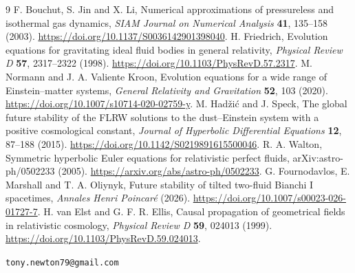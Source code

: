 \documentclass[11pt,a4paper]{article}
\begin{document}
\begin{thebibliography}{9}
F. Bouchut, S. Jin and X. Li,
Numerical approximations of
pressureless and isothermal gas dynamics,
\emph{SIAM Journal on Numerical Analysis}
\textbf{41}, 135--158 (2003).
\url{https://doi.org/10.1137/S0036142901398040}.
H. Friedrich,
Evolution equations for gravitating
ideal fluid bodies in general relativity,
\emph{Physical Review D} \textbf{57},
2317--2322 (1998).
\url{https://doi.org/10.1103/PhysRevD.57.2317}.
M. Normann and J. A. Valiente Kroon,
Evolution equations for a wide range
of Einstein--matter systems,
\emph{General Relativity and Gravitation}
\textbf{52}, 103 (2020).
\url{https://doi.org/10.1007/s10714-020-02759-y}.
M. Had\v{z}i\'c and J. Speck,
The global future stability of the
FLRW solutions to the dust--Einstein
system with a positive cosmological constant,
\emph{Journal of Hyperbolic Differential Equations}
\textbf{12}, 87--188 (2015).
\url{https://doi.org/10.1142/S0219891615500046}.
R. A. Walton, Symmetric hyperbolic Euler
equations for relativistic perfect fluids,
arXiv:astro-ph/0502233 (2005).
\url{https://arxiv.org/abs/astro-ph/0502233}.
G. Fournodavlos, E. Marshall and T. A. Oliynyk,
Future stability of tilted two-fluid Bianchi I spacetimes,
\emph{Annales Henri Poincar\'e} (2026).
\url{https://doi.org/10.1007/s00023-026-01727-7}.
H. van Elst and G. F. R. Ellis,
Causal propagation of geometrical fields
in relativistic cosmology,
\emph{Physical Review D} \textbf{59},
024013 (1999).
\url{https://doi.org/10.1103/PhysRevD.59.024013}.
\end{thebibliography}

\noindent\texttt{tony.newton79@gmail.com}
\end{document}
